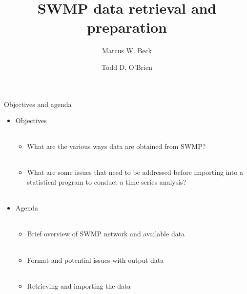 \documentclass[xcolor=svgnames]{beamer}\usepackage[]{graphicx}\usepackage[]{color}
\begin{document}
\title[Overview of SWMP and retrieval]{SWMP data retrieval and preparation}

\author[M. Beck, T. O'Brien]{Marcus W. Beck \and Todd D. O'Brien}

\date{}







\begin{frame}{Objectives and agenda}
\begin{itemize}
\onslide<+->
\item Objectives \\~\\
\begin{itemize}
\item What are the various ways data are obtained from SWMP? \\~\\
\item What are some issues that need to be addressed before importing into a statistical program to conduct a time series analysis? \\~\\
\end{itemize}
\onslide<+->
\item Agenda \\~\\
\begin{itemize}
\item Brief overview of SWMP network and available data \\~\\
\item Format and potential issues with output data \\~\\
\item Retrieving and importing the data \\~\\
\end{itemize}
\end{itemize}
\end{frame}
\end{document}
